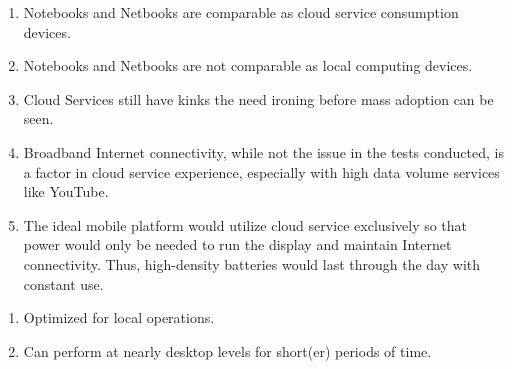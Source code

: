 \documentclass[letterpaper]{article}
\begin{document}
{\begin{center}
\end{center}

\begin{enumerate}

\item Notebooks and Netbooks are comparable as cloud service consumption
  devices.

\item Notebooks and Netbooks are not comparable as local computing devices.

\item Cloud Services still have kinks the need ironing before mass adoption can
  be seen.

\item Broadband Internet connectivity, while not the issue in the tests
  conducted, is a factor in cloud service experience, especially with high data
  volume services like YouTube.

\item The ideal mobile platform would utilize cloud service exclusively so that
  power would only be needed to run the display and maintain Internet
  connectivity.  Thus, high-density batteries would last through the day with
  constant use.

\end{enumerate}

\newpage


\begin{enumerate}

\item Optimized for local operations.

\item Can perform at nearly desktop levels for short(er) periods of time.

\end{enumerate}

}
\end{document}
